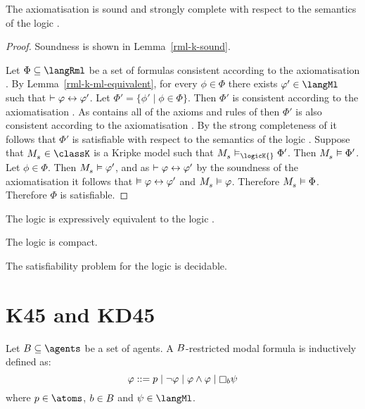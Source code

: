 \begin{theorem}\label{rml-k-sound-complete}
The axiomatisation \axiomRmlK{} is sound and strongly complete with respect to the semantics of the logic \logicRmlK{}.
\end{theorem}

\begin{proof}
Soundness is shown in Lemma~\ref{rml-k-sound}.

Let $\Phi \subseteq \langRml$ be a set of formulas consistent according to the axiomatisation \axiomRmlK{}.
By Lemma~\ref{rml-k-ml-equivalent}, for every $\phi \in \Phi$ there exists $\phi' \in \langMl$ such that $\vdash \varphi \leftrightarrow \varphi'$.
Let $\Phi' = \{\phi' \mid \phi \in \Phi\}$.
Then $\Phi'$ is consistent according to the axiomatisation \axiomRmlK{}.
As \axiomRmlK{} contains all of the axioms and rules of \axiomK{} then $\Phi'$ is also consistent according to the axiomatisation \axiomK{}.
By the strong completeness of \axiomK{} it follows that $\Phi'$ is satisfiable with respect to the semantics of the logic \logicK{}.
Suppose that $\kPModel{\kStateS} \in \classK$ is a Kripke model such that $\kPModel{\kStateS} \entails_\logicK{} \Phi'$.
Then $\kPModel{\kStateS} \entails \Phi'$.
Let $\phi \in \Phi$.
Then $\kPModel{\kStateS} \entails \phi'$, and as $\vdash \varphi \leftrightarrow \varphi'$ by the soundness of the axiomatisation \axiomRmlK{} it follows that $\vDash \varphi \leftrightarrow \varphi'$ and $\kPModel{\kStateS} \entails \phi$.
Therefore $\kPModel{\kStateS} \entails \Phi$.
Therefore $\Phi$ is satisfiable.
\end{proof}

\begin{corollary}
The logic \logicRmlK{} is expressively equivalent to the logic \logicK{}.
\end{corollary}

\begin{corollary}
The logic \logicRmlK{} is compact.
\end{corollary}

\begin{corollary}
The satisfiability problem for the logic \logicRmlK{} is decidable.
\end{corollary}

\section{K45 and KD45}

\begin{definition}
Let $\agentsB \subseteq \agents$ be a set of agents.
A $B$-restricted modal formula is inductively defined as:
$$
\phi ::= \atomP \mid
         \lnot \phi \mid
         \phi \land \phi \mid
         \necessary[\agentB] \psi
$$
where $\atomP \in \atoms$, $b \in B$ and $\psi \in \langMl$.
\end{definition}

